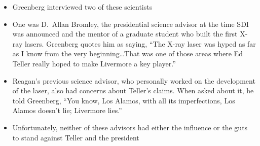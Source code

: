 \documentclass[12pt]{article}
\begin{document}
\begin{description}
\begin{description}
\begin{itemize}
          \item Greenberg interviewed two of these scientists

          \item One was D.\ Allan Bromley, the presidential science advisor at
            the time SDI was announced and the mentor of a graduate student who
            built the first X-ray lasers. Greenberg quotes him as saying, ``The
            X-ray laser was hyped as far as I know from the very
            beginning\ldots That was one of those areas where Ed Teller really
            hoped to make Livermore a key player.''

          \item Reagan's previous science advisor, who personally worked on the
            development of the laser, also had concerns about Teller's claims.
            When asked about it, he told Greenberg, ``You know, Los Alamos,
            with all its imperfections, Los Alamos doesn't lie; Livermore
            lies.''

          \item Unfortunately, neither of these advisors had either the
            influence or the guts to stand against Teller and the president

        \end{itemize}
        



\end{description}
\end{description}
\end{document}
